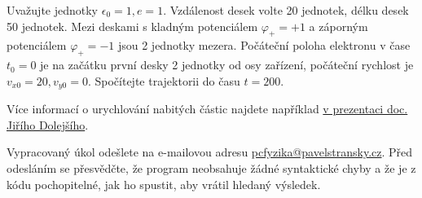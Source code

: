 \documentclass[a4paper,11pt,twoside]{article}
\begin{document}
Uvažujte jednotky $\epsilon_{0}=1,e=1$. 
Vzdálenost desek volte 20 jednotek, délku desek 50 jednotek. 
Mezi deskami s kladným potenciálem $\varphi_{+}=+1$ a záporným potenciálem $\varphi_{+}=-1$ jsou 2 jednotky mezera.
Počáteční poloha elektronu v čase $t_{0}=0$ je na začátku první desky 2 jednotky od osy zařízení, počáteční rychlost je $v_{x0}=20, v_{y0}=0$.
Spočítejte trajektorii do času $t=200$.

Více informací o urychlování nabitých částic najdete například \href{http://ipnp.cz/~dolejsi/textbook/Accelerators_CZ.ppt}{v prezentaci doc. Jiřího Dolejšího}.

Vypracovaný úkol odešlete na e-mailovou adresu \href{mailto:pcfyzika@pavelstransky.cz}{pcfyzika@pavelstransky.cz}.
Před odesláním se přesvědčte, že program neobsahuje žádné syntaktické chyby a že je z kódu pochopitelné, jak ho spustit, aby vrátil hledaný výsledek.
\end{document}
